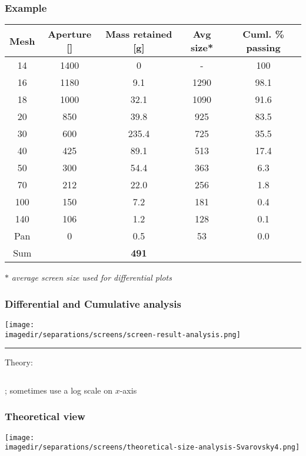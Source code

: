 \begin{frame}\frametitle{Example}
	\begin{tabular}{ccc|c|c}
		Mesh&Aperture [\micron]	& Mass retained [g]	& Avg size* & {\scriptsize Cuml. \% passing} \\ \hline
		14	& 1400		& 0		& -      &  100           \\
		16	& 1180		& 9.1	& 1290   &  98.1          \\
		18	& 1000		& 32.1	& 1090   &  91.6          \\
		20	& 850		& 39.8	& 925    &  83.5          \\
		30	& 600		& 235.4	& 725    &  35.5          \\
		40	& 425		& 89.1	& 513    &  17.4          \\
		50	& 300		& 54.4	& 363    &  6.3           \\
		70	& 212		& 22.0	& 256    &  1.8           \\
		100	& 150		& 7.2	& 181    &  0.4           \\
		140	& 106		& 1.2	& 128    &  0.1           \\
		Pan	& 0			& 0.5	& 53     &  0.0           \\ \hline 
		Sum	&  			& \textbf{491}   &     			  \\ \hline
	\end{tabular}
	
	\vspace{12pt}
	$\ast$ \emph{\scriptsize average screen size used for differential plots}
\end{frame}
 
\begin{frame}\frametitle{Differential and Cumulative analysis}
	\begin{center}
		\texttt{[image: \\imagedir/separations/screens/screen-result-analysis.png]}
	\end{center}
	\hrule
	\vspace{6pt}
	Theory:
	\begin{columns}[t]
			{\color{myBlue}{\[f(x) = \displaystyle\frac{dF(x)}{dx}\]}}
			{\color{myGreen}{\[F(x) = \text{percent passing curve}\]}}
	\end{columns}
	\vspace{18pt}
	; sometimes use a log scale on $x$-axis
\end{frame}

\begin{frame}\frametitle{Theoretical view}
	\begin{center}
		\texttt{[image: \\imagedir/separations/screens/theoretical-size-analysis-Svarovsky4.png]}
	\end{center}
	\vfill
\end{frame}

